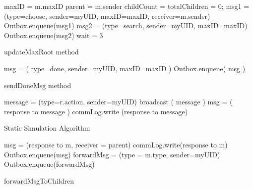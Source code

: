 \documentclass[english]{article}
\begin{document}
\begin{algorithm}[updateMaxRoot]
  maxID = m.maxID\; %
  parent = m.sender\; %
  childCount = totalChildren = 0; %
  msg1 = (type=choose, sender=myUID, maxID=maxID, receiver=m.sender) \; %
  Outbox.enqueue(msg1) \;
  msg2 = (type=search, sender=myUID, maxID=maxID) \; %
  Outbox.enqueue(msg2) \;
  wait = 3 \; %
  \caption{updateMaxRoot method}
\end{algorithm}

\begin{algorithm} [sendDoneMsg]
  msg = ( type=done, sender=myUID, maxID=maxID ) \;
  Outbox.enqueue( msg ) \;
  \caption{sendDoneMsg method}
\end{algorithm}

\begin{algorithm} 
   {
     {
      message = (type=r.action, sender=myUID) \;
      broadcast ( message ) \;
      msg = ( response to message ) \;
      commLog.write (response to message) \;
    }
  }
  \caption{Static Simulation Algorithm}
\end{algorithm}

\begin{algorithm} [forwardMsgToChildren]
  msg = (response to m, receiver = parent) \;
  commLog.write(response to m) \;
   {
    Outbox.enqueue(msg) \;
  } { %
    forwardMsg = (type = m.type, sender=myUID) \;
    Outbox.enqueue(forwardMsg) \;
  }
  \caption{forwardMsgToChildren}
\end{algorithm}
\end{document}
